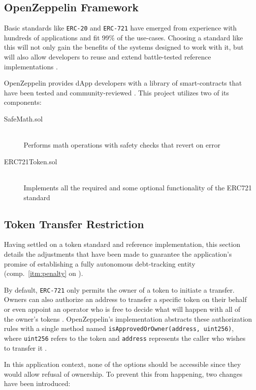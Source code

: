 \subsection{OpenZeppelin Framework}
Basic standards like \texttt{\acs{ERC}-20} and \texttt{\acs{ERC}-721} have emerged from experience with hundreds of applications and fit 99\% of the use-cases. Choosing a standard like this will not only gain the benefits of the systems designed to work with it, but will also allow developers to reuse and extend battle-tested reference implementations \cite[pp.~199--200]{Antonopoulos.2018}. 

OpenZeppelin provides \ac{dApp} developers with a library of smart-contracts that have been tested and community-reviewed \cite{openZeppelin}. This project utilizes two of its components:

\begin{description}
  \item[SafeMath.sol]
  \hfill \\
  Performs math operations with safety checks that revert on error
  \item[ERC721Token.sol]
  \hfill \\Implements all the required and some optional functionality of the ERC721 standard
\end{description}
 
\subsection{Token Transfer Restriction}
Having settled on a token standard and reference implementation, this section details the adjustments that have been made to guarantee the application's promise of establishing a fully autonomous debt-tracking entity (comp.~\ref{itm:penalty} on ). 

By default, \texttt{\acs{ERC}-721} only permits the owner of a token to initiate a transfer. Owners can also authorize an address to transfer a specific token on their behalf or even appoint an operator who is free to decide what will happen with all of the owner's tokens \cite{erc721}. OpenZeppelin's implementation abstracts these authorization rules with a single method named \texttt{isApprovedOrOwner(address, uint256)}, where \texttt{uint256} refers to the token and \texttt{address} represents the caller who wishes to transfer it \cite{openZeppelinGitHub}.

In this application context, none of the options should be accessible since they would allow refusal of ownership. To prevent this from happening, two changes have been introduced: 

